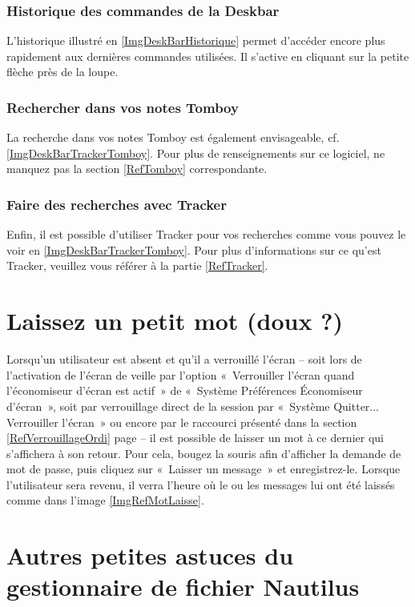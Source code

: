 \subsubsection{Historique des commandes de la Deskbar}
L'historique illustré en \ref{ImgDeskBarHistorique} permet d'accéder encore plus rapidement aux dernières commandes utilisées. Il s'active en cliquant sur la petite flèche près de la loupe.
\DeskBarPartieDeux
\afterpage{\clearpage}
\subsubsection{Rechercher dans vos notes Tomboy}
La recherche dans vos notes Tomboy est également envisageable, cf. \ref{ImgDeskBarTrackerTomboy}. Pour plus de renseignements sur ce logiciel, ne manquez pas la section \ref{RefTomboy} correspondante.
\subsubsection{Faire des recherches avec Tracker}
Enfin, il est possible d'utiliser Tracker pour vos recherches comme vous pouvez le voir en \ref{ImgDeskBarTrackerTomboy}. Pour plus d'informations sur ce qu'est Tracker, veuillez vous référer à la partie \ref{RefTracker}.
\newpage%
\section{Laissez un petit mot (doux ?)}
Lorsqu'un utilisateur est absent et qu'il a verrouillé l'écran -- soit lors de l'activation de l'écran de veille par l'option «~Verrouiller l'écran quand l'économiseur d'écran est actif~» de «~Système \FlecheDroite Préférences \FlecheDroite Économiseur d'écran~», soit par verrouillage direct de la session par «~Système \FlecheDroite Quitter... \FlecheDroite Verrouiller l'écran~» ou encore par le raccourci présenté dans la section \ref{RefVerrouillageOrdi} page \pageref{RefVerrouillageOrdi} -- il est possible de laisser un mot à ce dernier qui s'affichera à son retour. Pour cela, bougez la souris afin d'afficher la demande de mot de passe, puis cliquez sur «~Laisser un message~» et enregistrez-le. Lorsque l'utilisateur sera revenu, il verra l'heure où le ou les messages lui ont été laissés comme dans l'image \ref{ImgRefMotLaisse}.
\section{Autres petites astuces du gestionnaire de fichier Nautilus}
